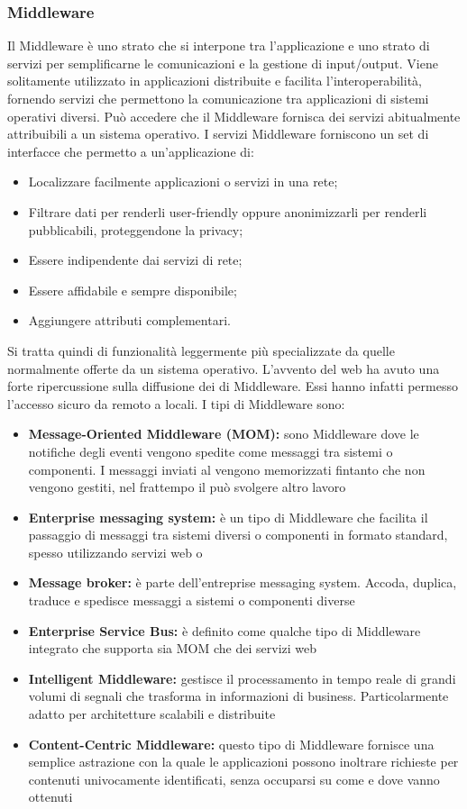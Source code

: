 \documentclass[12pt,a4paper]{article}
\begin{document}
\subsubsection{Middleware}
Il Middleware è uno strato  che si interpone tra l’applicazione  e uno strato di servizi per semplificarne le comunicazioni e la gestione di input/output. Viene solitamente utilizzato in applicazioni distribuite e facilita l’interoperabilità, fornendo servizi che permettono la comunicazione tra applicazioni di sistemi operativi diversi. Può accedere che il Middleware fornisca dei servizi abitualmente attribuibili a un sistema operativo. I servizi Middleware forniscono un set di interfacce che permetto a un’applicazione di:
\begin{itemize}
	\item Localizzare facilmente applicazioni o servizi in una rete;
	\item Filtrare dati per renderli user-friendly oppure anonimizzarli per renderli pubblicabili, proteggendone la privacy;
	\item Essere indipendente dai servizi di rete;
	\item Essere affidabile e sempre disponibile;
	\item Aggiungere attributi complementari.
\end{itemize}
Si tratta quindi di funzionalità leggermente più specializzate da quelle normalmente offerte da un sistema operativo. L’avvento del web ha avuto una forte ripercussione sulla diffusione dei  di Middleware. Essi hanno infatti permesso l’accesso sicuro da remoto a  locali. I tipi di Middleware sono:
\begin{itemize}
	\item \textbf{Message-Oriented Middleware (MOM):} sono Middleware dove le notifiche degli	eventi vengono spedite come messaggi tra sistemi o componenti. I messaggi inviati al
	 vengono memorizzati fintanto che non vengono gestiti, nel frattempo il  può	svolgere altro lavoro 
	\item \textbf{Enterprise messaging system:} è un tipo di Middleware che facilita il passaggio di messaggi tra sistemi diversi o componenti in formato standard, spesso utilizzando servizi web o 
	\item \textbf{Message broker:} è parte dell'entreprise messaging system. Accoda, duplica, traduce e spedisce messaggi a sistemi o componenti diverse
	\item \textbf{Enterprise Service Bus:} è definito come qualche tipo di Middleware integrato che supporta sia MOM che dei servizi web
	\item \textbf{Intelligent Middleware:} gestisce il processamento in tempo reale di grandi volumi di segnali che trasforma in informazioni di business. Particolarmente adatto per architetture scalabili e distribuite
	\item \textbf{Content-Centric Middleware:} questo tipo di Middleware fornisce una semplice astrazione con la quale le applicazioni possono inoltrare richieste per contenuti univocamente identificati, senza occuparsi su come e dove vanno ottenuti
\end{itemize}
\end{document}
